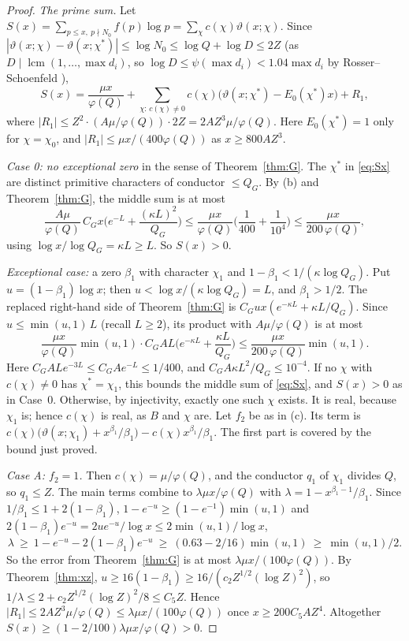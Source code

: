 \documentclass[11pt,reqno]{amsart}
\theoremstyle{definition}
\newcommand{\lcm}{\operatorname{lcm}}
\begin{document}
\begin{proof}
\emph{The prime sum.}  Let
$S(x)=\sum_{p\le x,\ p\nmid N_0}f(p)\log p=\sum_\chi c(\chi)\vartheta(x;\chi)$.  Since
$|\vartheta(x;\chi)-\vartheta(x;\chi^*)|\le\log N_0\le\log Q+\log D\le2Z$ (as
$D\mid\lcm(1,\dots,\max d_i)$, so $\log D\le\psi(\max d_i)<1.04\max d_i$ by
Rosser--Schoenfeld \cite{RS}),
\begin{equation}\label{eq:Sx}
 S(x)=\frac{\mu x}{\varphi(Q)}+\sum_{\chi:\,c(\chi)\ne0}c(\chi)\big(\vartheta(x;\chi^*)-E_0(\chi^*)x\big)+R_1,
\end{equation}
where $|R_1|\le Z^2\cdot(A\mu/\varphi(Q))\cdot2Z=2AZ^3\mu/\varphi(Q)$.  Here
$E_0(\chi^*)=1$ only for $\chi=\chi_0$, and $|R_1|\le\mu x/(400\varphi(Q))$ as
$x\ge800AZ^3$.

\emph{Case 0: no exceptional zero} in the sense of Theorem~\ref{thm:G}.  The
$\chi^*$ in \eqref{eq:Sx} are distinct primitive characters of conductor
$\le Q_G$.  By (b) and Theorem~\ref{thm:G}, the middle sum is at most
\[
 \frac{A\mu}{\varphi(Q)}\,C_Gx\Big(e^{-L}+\frac{(\kappa L)^2}{Q_G}\Big)
 \le\frac{\mu x}{\varphi(Q)}\Big(\frac1{400}+\frac1{10^4}\Big)\le\frac{\mu x}{200\,\varphi(Q)},
\]
using $\log x/\log Q_G=\kappa L\ge L$.  So $S(x)>0$.

\emph{Exceptional case:} a zero $\beta_1$ with character $\chi_1$ and
$1-\beta_1<1/(\kappa\log Q_G)$.  Put $u=(1-\beta_1)\log x$; then
$u<\log x/(\kappa\log Q_G)=L$, and $\beta_1>1/2$.  The replaced right-hand side
of Theorem~\ref{thm:G} is $C_Gux(e^{-\kappa L}+\kappa L/Q_G)$.  Since
$u\le\min(u,1)\,L$ (recall $L\ge2$), its product with $A\mu/\varphi(Q)$ is at
most
\[
 \frac{\mu x}{\varphi(Q)}\min(u,1)\cdot C_GAL\Big(e^{-\kappa L}+\frac{\kappa L}{Q_G}\Big)
 \le\frac{\mu x}{200\,\varphi(Q)}\min(u,1).
\]
Here $C_GALe^{-3L}\le C_GAe^{-L}\le1/400$, and
$C_GA\kappa L^2/Q_G\le10^{-4}$.  If no $\chi$ with $c(\chi)\ne0$ has
$\chi^*=\chi_1$, this bounds the middle sum of \eqref{eq:Sx}, and $S(x)>0$
as in Case~0.  Otherwise, by injectivity, exactly one such $\chi$ exists.  It
is real, because $\chi_1$ is; hence $c(\chi)$ is real, as $B$ and $\chi$ are.
Let $f_2$ be as in (c).
Its term is
$c(\chi)\big(\vartheta(x;\chi_1)+x^{\beta_1}/\beta_1\big)-c(\chi)x^{\beta_1}/\beta_1$.
The first part is covered by the bound just proved.

\emph{Case A: $f_2=1$.}  Then $c(\chi)=\mu/\varphi(Q)$, and the
conductor $q_1$ of $\chi_1$ divides $Q$, so $q_1\le Z$.  The main terms combine
to $\lambda\mu x/\varphi(Q)$ with $\lambda=1-x^{\beta_1-1}/\beta_1$.  Since
$1/\beta_1\le1+2(1-\beta_1)$, $1-e^{-u}\ge(1-e^{-1})\min(u,1)$ and
$2(1-\beta_1)e^{-u}=2ue^{-u}/\log x\le2\min(u,1)/\log x$,
\[
 \lambda\ \ge\ 1-e^{-u}-2(1-\beta_1)e^{-u}\ \ge\ (0.63-2/16)\min(u,1)\ \ge\ \min(u,1)/2 .
\]
So the error from Theorem~\ref{thm:G} is at most $\lambda\mu x/(100\varphi(Q))$.
By Theorem~\ref{thm:xz}, $u\ge16(1-\beta_1)\ge16/(c_2Z^{1/2}(\log Z)^2)$, so
$1/\lambda\le2+c_2Z^{1/2}(\log Z)^2/8\le C_5Z$.  Hence
$|R_1|\le2AZ^3\mu/\varphi(Q)\le\lambda\mu x/(100\varphi(Q))$ once
$x\ge200C_5AZ^4$.  Altogether $S(x)\ge(1-2/100)\lambda\mu x/\varphi(Q)>0$.


\end{proof}
\end{document}
